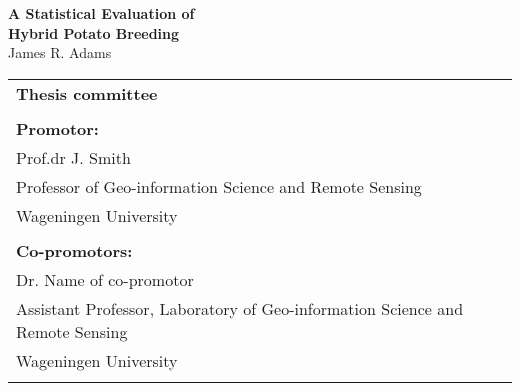 \thispagestyle{empty}
\begin{center}
\Huge{\textbf{A Statistical Evaluation of}} \\
\Huge{\textbf{Hybrid Potato Breeding}} \\
\vspace*{1cm}
\vspace*{1cm}
\vspace*{\fill}
\large{James R. Adams}\\
\end{center}

\newpage
\thispagestyle{empty}
\vspace*{\fill}
\begin{tabular}{l}
    \textbf{Thesis committee}                                                                 \\  
                                                                                              \\  
    \textbf{Promotor:}                                                                        \\  
    Prof.dr J. Smith                                                                          \\  
    Professor of Geo-information Science and Remote Sensing                                   \\  
    Wageningen University                                                                     \\  
                                                                                              \\  
    \textbf{Co-promotors:}                                                                    \\  
    Dr. Name of co-promotor                                                                   \\  
    Assistant Professor, Laboratory of Geo-information Science and Remote Sensing             \\  
    Wageningen University                                                                     \\  
                                                                                              \\  


\end{tabular}
